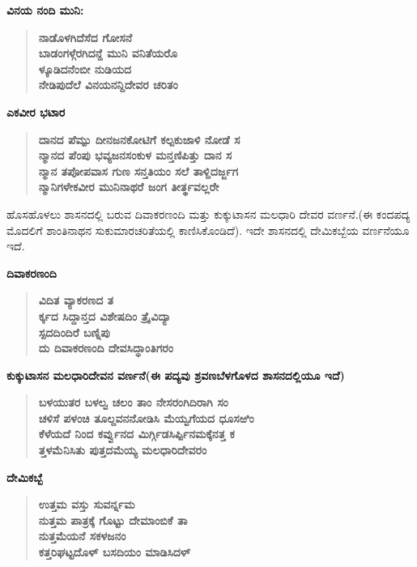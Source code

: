 \noindent
\textbf{ವಿನಯ ನಂದಿ ಮುನಿ:}

\begin{verse}
\textbf{ನಾಡೊಳಗಿದೆಸೆದ ಗೋಸನೆ \\ ಬಾಡಂಗಳ್ಗೆರಗಿದನ್ದೆ ಮುನಿ ವನಿತೆಯರೊ\\ ಳ್ಕೂಡಿದನೆಂಬೀ ನುಡಿಯದ \\ ನೇಡಿಪುದೆಲೆ ವಿನಯನನ್ದಿದೇವರ ಚರಿತಂ}
\end{verse}

\newpage

\noindent
\textbf{ಎಕವೀರ ಭಟಾರ}

\begin{verse}
\textbf{ದಾನದ ಪೆಮ್ಪು ದೀನಜನಕೋಟಿಗೆ ಕಲ್ಪಕುಜಾಳಿ ನೋಡೆ ಸ \\ ನ್ಮಾನದ ಪೆಂಪು ಭವ್ಯಜನಸಂಕುಳ ಮನ್ತಣಿಪಿತ್ತು ದಾನ ಸ \\ ನ್ಮಾನ ತಪೋಪವಾಸ ಗುಣ ಸನ್ತತಿಯಂ ಸಲೆ ತಾಳ್ದಿದರ್ಜ್ಜಗ \\ ನ್ಮಾನಿಗಳೇಕವೀರ ಮುನಿನಾಥರೆ ಜಂಗ ತೀರ್ತ್ಥವಲ್ಲರೇ}
\end{verse}

ಹೊಸಹೊಳಲು ಶಾಸನದಲ್ಲಿ ಬರುವ ದಿವಾಕರಣಂದಿ ಮತ್ತು ಕುಕ್ಕುಟಾಸನ ಮಲಧಾರಿ ದೇವರ ವರ್ಣನೆ.\break (ಈ ಕಂದಪದ್ಯ ಮೊದಲಿಗೆ ಶಾಂತಿನಾಥನ ಸುಕುಮಾರಚರಿತೆಯಲ್ಲಿ ಕಾಣಿಸಿಕೊಂಡಿದೆ). ಇದೇ ಶಾಸನದಲ್ಲಿ ದೇಮಿಕಬ್ಬೆಯ ವರ್ಣನೆಯೂ ಇದೆ.

\noindent
\textbf{ದಿವಾಕರಣಂದಿ}

\begin{verse}
\textbf{ವಿದಿತ ವ್ಯಾಕರಣದ ತ \\ ರ್ಕ್ಕದ ಸಿದ್ದಾನ್ತದ ವಿಶೇಷದಿಂ ತ್ರೈವಿದ್ಯಾ \\ ಸ್ಪದದಿಂದಿರೆ ಬಣ್ನಿಪು \\ ದು ದಿವಾಕರಣಂದಿ ದೇವಸಿದ್ಧಾಂತಿಗರಂ}
\end{verse}

\noindent
\textbf{ಕುಕ್ಕುಟಾಸನ ಮಲಧಾರಿದೇವನ ವರ್ಣನೆ(ಈ ಪದ್ಯವು ಶ್ರವಣಬೆಳಗೊಳದ ಶಾಸನದಲ್ಲಿಯೂ ಇದೆ)}

\begin{verse}
\textbf{ಬಳಯುತರ ಬಳಲ್ವ ಚಲಂ ತಾಂ ನೇಸರಂಗಿದಿರಾಗಿ ಸಂ \\ ಚಳಿಸೆ ಪಳಂಚಿ ತೂಲ್ದವನನೋಡಿಸಿ ಮೆಯ್ವಗೆಯದ ಧೂಸಱಿಂ \\ ಕೆಳೆಯದೆ ನಿಂದ ಕರ್ವ್ವುನದ ಮಿರ್ಗ್ಗಿಡಸಿರ್ಪ್ಪಿನಮಕ್ಕೆನತ್ತ ಕ \\ ತ್ತಳಮೆನಿಸಿತು ಪುತ್ತದಮೆಯ್ಯ ಮಲಧಾರಿದೇವರಂ}
\end{verse}

\noindent
\textbf{ದೇಮಿಕಬ್ಬೆ}

\begin{verse}
\textbf{ಉತ್ತಮ ವಸ್ತು ಸುವರ್ನ್ನಮ\\ ನುತ್ತಮ ಪಾತ್ರಕ್ಕೆ ಗೊಟ್ಟು ದೇಮಾಂಬಿಕೆ ತಾ\\ ನುತ್ತಮೆಯನೆ ಸಕಳಜನಂ\\ ಕತ್ತರಿಘಟ್ಟದೊಳ್ ಬಸದಿಯಂ ಮಾಡಿಸಿದಳ್}
\end{verse}

